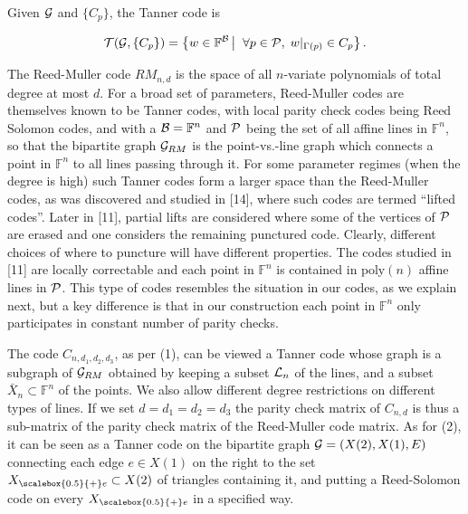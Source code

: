 Given ${\cal G}$ and $\{C_{p}\}$, the Tanner code is\par


\[\begin{gathered}
{\cal T}({\cal G},\{C_{p}\})=\left\{w\in\mathbb{F}^{\cal B}\left|\;\vphantom{w\in\mathbb{F}^{\cal B}\forall p\in{\cal P},\;w|_{\Gamma(p)}\in C_{p}}\right.\forall p\in{\cal P},\;w|_{\Gamma(p)}\in C_{p}\right\}.
\end{gathered}\]




The Reed-Muller code $RM_{n,d}$ is the space of all $n$-variate polynomials of total degree at most $d$.
For a broad set of parameters, Reed-Muller codes are themselves known to be Tanner codes, with local parity check codes being Reed Solomon codes, and with a ${\cal B}=\mathbb{F}^{n}$ and ${\cal P}$ being the set of all affine lines in $\mathbb{F}^{n}$, so that the bipartite graph ${\cal G}_{RM}$ is the point-vs.-line graph which connects a point in $\mathbb{F}^{n}$ to all lines passing through it.
For some parameter regimes (when the degree is high) such Tanner codes form a larger space than the Reed-Muller codes, as was discovered and studied in [14], where such codes are termed “lifted codes”.
Later in [11], partial lifts are considered where some of the vertices of ${\cal P}$ are erased and one considers the remaining punctured code. Clearly, different choices of where to puncture will have different properties. The codes studied in [11] are locally correctable and each point in $\mathbb{F}^{n}$ is contained in $\mathrm{poly}(n)$ affine lines in ${\cal P}$.
This type of codes resembles the situation in our codes, as we explain next, but a key difference is that in our construction each point in $\mathbb{F}^{n}$ only participates in constant number of parity checks.\par




The code $C_{n,d_{1},d_{2},d_{3}}$, as per (1), can be viewed a Tanner code whose graph is a subgraph of ${\cal G}_{RM}$ obtained by keeping a subset ${\cal L}_{n}$ of the lines, and a subset $\bar{X}_{n}\subset\mathbb{F}^{n}$ of the points. We also allow different degree restrictions on different types of lines. If we set $d=d_{1}=d_{2}=d_{3}$ the parity check matrix of $C_{n,d}$ is thus a sub-matrix of the parity check matrix of the Reed-Muller code matrix.
As for (2), it can be seen as a Tanner code on the bipartite graph ${\cal G}=(X(2),X(1),E)$ connecting each edge $e\in X(1)$ on the right to the set ${X}_{\scalebox{0.5}{+}e}\subset X(2)$ of triangles containing it, and putting a Reed-Solomon code on every ${X}_{\scalebox{0.5}{+}e}$ in a specified way.\par





